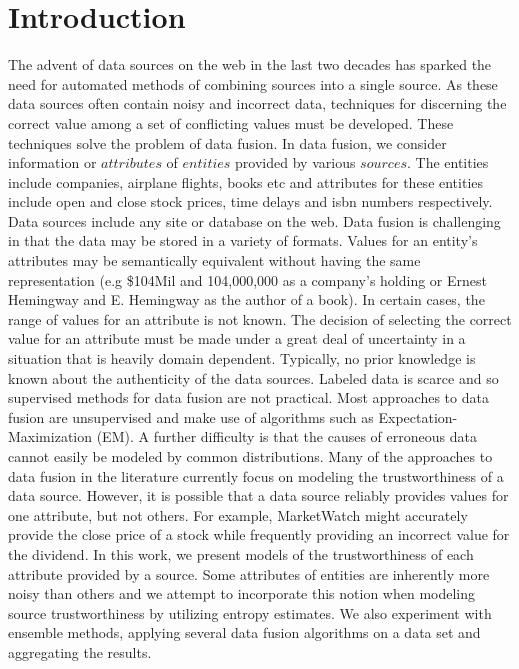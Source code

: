 \documentclass{acm_proc_article-sp}
\begin{document}
\maketitle





\section{Introduction}

The advent of data sources on the web in the last two decades has sparked the need for automated methods of combining sources into a single source. As these data sources often contain noisy and incorrect data, techniques for discerning the correct value among a set of conflicting values must be developed. These techniques solve the problem of data fusion. In data fusion, we consider information or $attributes$ of $entities$ provided by various $sources$. The entities include companies, airplane flights, books etc and attributes for these entities include open and close stock prices, time delays and isbn numbers respectively. Data sources include any site or database on the web. Data fusion is challenging in that the data may be stored in a variety of formats. Values for an entity's attributes may be semantically equivalent without having the same representation (e.g \$104Mil and 104,000,000 as a company's holding or Ernest Hemingway and E. Hemingway as the author of a book). In certain cases, the range of values for an attribute is not known. The decision of selecting the correct value for an attribute must be made under a great deal of uncertainty in a situation that is heavily domain dependent. Typically, no prior knowledge is known about the authenticity of the data sources. Labeled data is scarce and so supervised methods for data fusion are not practical. Most approaches to data fusion are unsupervised and make use of algorithms such as Expectation-Maximization (EM). A further difficulty is that the causes of erroneous data cannot easily be modeled by common distributions. Many of the approaches to data fusion in the literature currently focus on modeling the trustworthiness of a data source. However, it is possible that a data source reliably provides values for one attribute, but not others. For example, MarketWatch might accurately provide the close price of a stock while frequently providing an incorrect value for the dividend. In this work, we present models of the trustworthiness of each attribute provided by a source. Some attributes of entities are inherently more noisy than others and we attempt to incorporate this notion when modeling source trustworthiness by utilizing entropy estimates. We also experiment with ensemble methods, applying several data fusion algorithms on a data set and aggregating the results. 
\end{document}
